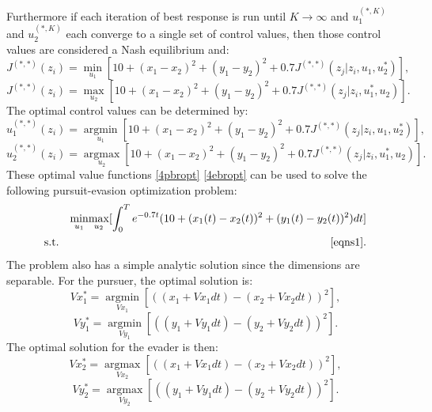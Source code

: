 Furthermore if each iteration of best response is run until $K \rightarrow \infty$ and $u_1^{(*,K)}$ and $u_2^{(*,K)}$ each converge to a single set of control values, then those control values are considered a Nash equilibrium and:
\begin{equation}\label{4pbropt}
J^{(*,*)}(z_i)= \underset{u_1 }{\operatorname{min }}[10+(x_1-x_2)^2+(y_1-y_2)^2+0.7 J^{(*,*)}(z_j|z_i,u_1,u_2^*)],
\end{equation}
\begin{equation}\label{4ebropt}
J^{(*,*)}(z_i)= \underset{u_2 }{\operatorname{max }}[10+(x_1-x_2)^2+(y_1-y_2)^2+0.7 J^{(*,*)}(z_j|z_i,u_1^*,u_2)].
\end{equation}
The optimal control values can be determined by:
\begin{equation}\label{4pbrcont}
u_1^{(*,*)}(z_i)= \underset{u_1 }{\operatorname{arg min }}[10+(x_1-x_2)^2+(y_1-y_2)^2+0.7 J^{(*,*)}(z_j|z_i,u_1,u_2^*)],
\end{equation}
\begin{equation}\label{4ebrcont}
u_2^{(*,*)}(z_i)= \underset{u_2 }{\operatorname{arg max }}[10+(x_1-x_2)^2+(y_1-y_2)^2+0.7 J^{(*,*)}(z_j|z_i,u_1^*,u_2)].
\end{equation}    
These optimal value functions \ref{4pbropt} \ref{4ebropt} can be used to solve the following pursuit-evasion optimization problem:
\begin{eqnarray}\label{4opt}
&&\underset{u_1 }{\operatorname{min }}\underset{u_2 }{\operatorname{max }}[\int_{0}^{T}e^{-0.7t}(10+(x_1(t)-x_2(t))^2+(y_1(t)-y_2(t))^2)dt]\\
&\textnormal{s.t.}&\ref{eqns1}.
\end{eqnarray}
The problem also has a simple analytic solution since the dimensions are separable. For the pursuer, the optimal solution is:
\begin{equation}\label{puroptx}
Vx_1^*= \underset{Vx_1 }{\operatorname{arg min }}[((x_1 + Vx_1dt)-(x_2+Vx_2dt))^2],
\end{equation}
\begin{equation}\label{puropty}
Vy_1^*= \underset{Vy_1 }{\operatorname{arg min }}[((y_1 + Vy_1dt)-(y_2+Vy_2dt))^2].
\end{equation}
The optimal solution for the evader is then:
\begin{equation}\label{evadoptx}
Vx_2^*= \underset{Vx_2 }{\operatorname{arg max }}[((x_1 + Vx_1dt)-(x_2+Vx_2dt))^2],
\end{equation}
\begin{equation}\label{evadopty}
Vy_2^*= \underset{Vy_2 }{\operatorname{arg max }}[((y_1 + Vy_1dt)-(y_2+Vy_2dt))^2].
\end{equation}

